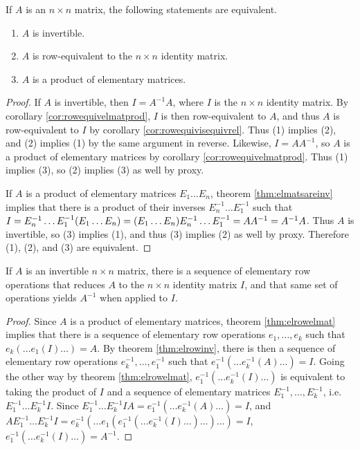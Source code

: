 \documentclass[12pt]{article}
\begin{document}
\begin{thm} \label{thm:invroweqelmatprod}
  If $A$ is an $n \times n$ matrix, the following statements are
  equivalent.
  \begin{enumerate}
    \item $A$ is invertible.
    \item $A$ is row-equivalent to the $n \times n$ identity
      matrix.
    \item $A$ is a product of elementary matrices.
  \end{enumerate}

  \begin{proof}
    If $A$ is invertible, then $I = A^{-1}A$, where $I$ is the $n
    \times n$ identity matrix. By corollary
    \ref{cor:rowequivelmatprod}, $I$ is then row-equivalent to
    $A$, and thus $A$ is row-equivalent to $I$ by corollary
    \ref{cor:rowequivisequivrel}. Thus (1) implies (2), and (2)
    implies (1) by the same argument in reverse. Likewise, $I =
    AA^{-1}$, so $A$ is a product of elementary matrices by
    corollary \ref{cor:rowequivelmatprod}. Thus (1) implies (3),
    so (2) implies (3) as well by proxy.

    If $A$ is a product of elementary matrices $E_1 \ldots E_n$,
    theorem \ref{thm:elmatsareinv} implies that there is a
    product of their inverses $E_n^{-1} \ldots E_1^{-1}$ such
    that $I =\\ E_n^{-1} \ldots E_1^{-1}(E_1 \ldots E_n) = (E_1
    \ldots E_n)E_n^{-1} \ldots E_1^{-1} = AA^{-1} = A^{-1}A$.
    Thus $A$ is invertible, so (3) implies (1), and thus (3)
    implies (2) as well by proxy. Therefore (1), (2), and (3) are
    equivalent.
  \end{proof}
\end{thm}

\begin{cor}
  If $A$ is an invertible $n \times n$ matrix, there is a
  sequence of elementary row operations that reduces $A$ to the
  $n \times n$ identity matrix $I$, and that same set of
  operations yields $A^{-1}$ when applied to $I$.

  \begin{proof}
    Since $A$ is a product of elementary matrices, theorem
    \ref{thm:elrowelmat} implies that there is a sequence of
    elementary row operations $e_1,\ldots,e_k$ such that\\
    $e_k(\ldots e_1(I)\ldots) = A$. By theorem
    \ref{thm:elrowinv}, there is then a sequence of elementary
    row operations $e_k^{-1},\ldots,e_1^{-1}$ such that
    $e_1^{-1}(\ldots e_k^{-1}(A)\ldots) = I$. Going the other way
    by theorem \ref{thm:elrowelmat}, $e_1^{-1}(\ldots
    e_k^{-1}(I)\ldots)$ is equivalent to taking the product of
    $I$ and a sequence of elementary matrices
    $E_1^{-1},\ldots,E_k^{-1}$, i.e. $E_1^{-1}\ldots E_k^{-1}I$.
    Since $E_1^{-1}\ldots E_k^{-1}IA = e_1^{-1}(\ldots
    e_k^{-1}(A)\ldots) = I$, and $AE_1^{-1}\ldots E_k^{-1}I =
    e_k^{-1}(\ldots e_1(e_1^{-1}(\ldots
    e_k^{-1}(I)\ldots)\ldots)\ldots) = I$, $e_1^{-1}(\ldots
    e_k^{-1}(I)\ldots) = A^{-1}$.
  \end{proof}
\end{cor}
\end{document}
